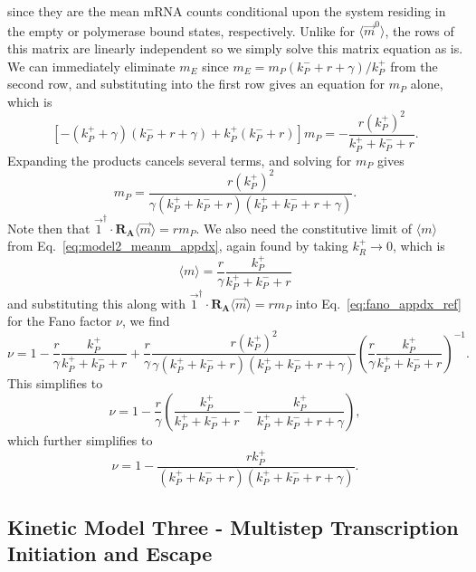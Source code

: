 since they are the mean mRNA counts conditional upon the system residing in the
empty or polymerase bound states, respectively. Unlike for
$\langle\vec{m}^0\rangle$, the rows of this matrix are linearly independent so
we simply solve this matrix equation as is. We can immediately eliminate $m_E$
since $m_E = m_P (k_P^- + r + \gamma)/k_P^+$ from the second row, and
substituting into the first row gives an equation for $m_P$ alone, which is
\begin{equation}
\left[-(k_P^+ + \gamma)(k_P^- + r + \gamma) + k_P^+(k_P^- + r)\right] m_P
= - \frac{r (k_P^+)^2}{k_P^+ + k_P^- + r}.
\end{equation}
Expanding the products cancels several terms, and solving for $m_P$ gives
\begin{equation}
m_P = \frac{r (k_P^+)^2}
            {\gamma(k_P^+ + k_P^- + r)(k_P^+ + k_P^- + r + \gamma)}.
\end{equation}
Note then that $\vec{1}^\dagger\cdot\mathbf{R_A}\langle\vec{m}\rangle = rm_P$.
We also need the constitutive limit of $\langle{m}\rangle$ from
Eq.~\ref{eq:model2_meanm_appdx}, again found by taking $k_R^+\rightarrow0$,
which is
\begin{equation}
\langle{m}\rangle = \frac{r}{\gamma} \frac{k_P^+ } {k_P^+ + k_P^- + r}
\end{equation}
and substituting this along with
$\vec{1}^\dagger\cdot\mathbf{R_A}\langle\vec{m}\rangle = rm_P$ into
Eq.~\ref{eq:fano_appdx_ref} for the Fano factor $\nu$, we find
\begin{equation}
\nu = 1 - \frac{r}{\gamma} \frac{k_P^+ } {k_P^+ + k_P^- + r}
    + \frac{r}{\gamma}\frac{r (k_P^+)^2}{\gamma(k_P^+ + k_P^- + r)
                                        (k_P^+ + k_P^- + r + \gamma)}
\left(\frac{r}{\gamma} \frac{k_P^+ } {k_P^+ + k_P^- + r}\right)^{-1}.
\end{equation}
This simplifies to
\begin{equation}
\nu = 1 - \frac{r}{\gamma}
    \left(
        \frac{k_P^+ } {k_P^+ + k_P^- + r}
        - \frac{k_P^+ } {k_P^+ + k_P^- + r + \gamma}
    \right),
\end{equation}
which further simplifies to
\begin{equation}
\nu = 1 - \frac{r k_P^+ } {(k_P^+ + k_P^- + r)(k_P^+ + k_P^- + r + \gamma)}.
\end{equation}
    
\subsection{Kinetic Model Three - Multistep Transcription Initiation and
Escape}

